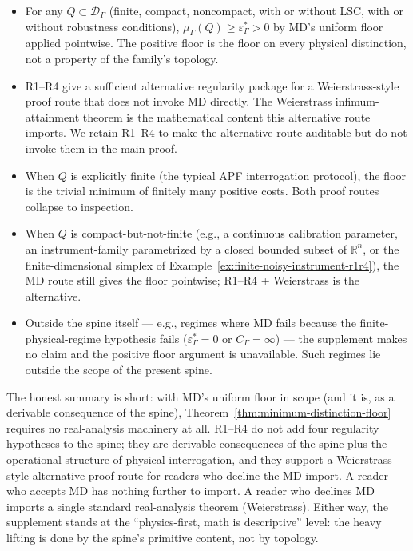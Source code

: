\documentclass[11pt]{article}
\begin{document}
\begin{itemize}[leftmargin=2em,topsep=4pt,itemsep=4pt]
\item For any $Q\subset\mathcal D_\Gamma$ (finite, compact, noncompact, with or without LSC, with or without robustness conditions), $\mu_\Gamma(Q) \ge \varepsilon^*_\Gamma > 0$ by MD's uniform floor applied pointwise.  The positive floor is the floor on every physical distinction, not a property of the family's topology.
\item R1--R4 give a sufficient alternative regularity package for a Weierstrass-style proof route that does not invoke MD directly.  The Weierstrass infimum-attainment theorem is the mathematical content this alternative route imports.  We retain R1--R4 to make the alternative route auditable but do not invoke them in the main proof.
\item When $Q$ is explicitly finite (the typical APF interrogation protocol), the floor is the trivial minimum of finitely many positive costs.  Both proof routes collapse to inspection.
\item When $Q$ is compact-but-not-finite (e.g., a continuous calibration parameter, an instrument-family parametrized by a closed bounded subset of $\mathbb R^n$, or the finite-dimensional simplex of Example~\ref{ex:finite-noisy-instrument-r1r4}), the MD route still gives the floor pointwise; R1--R4 + Weierstrass is the alternative.
\item Outside the spine itself --- e.g., regimes where MD fails because the finite-physical-regime hypothesis fails ($\varepsilon^*_\Gamma = 0$ or $C_\Gamma = \infty$) --- the supplement makes no claim and the positive floor argument is unavailable.  Such regimes lie outside the scope of the present spine.
\end{itemize}

The honest summary is short: with MD's uniform floor in scope (and it is, as a derivable consequence of the spine), Theorem~\ref{thm:minimum-distinction-floor} requires no real-analysis machinery at all.  R1--R4 do not add four regularity hypotheses to the spine; they are derivable consequences of the spine plus the operational structure of physical interrogation, and they support a Weierstrass-style alternative proof route for readers who decline the MD import.  A reader who accepts MD has nothing further to import.  A reader who declines MD imports a single standard real-analysis theorem (Weierstrass).  Either way, the supplement stands at the ``physics-first, math is descriptive'' level: the heavy lifting is done by the spine's primitive content, not by topology.
\end{document}
